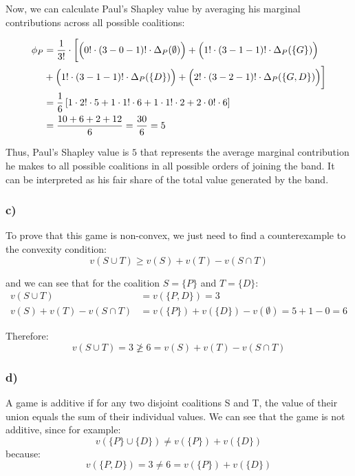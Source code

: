 \documentclass[10pt]{article}
\begin{document}
Now, we can calculate Paul's Shapley value by averaging his marginal contributions across all possible coalitions:

\begin{align*}
\phi_{P} &= \frac{1}{3!} \cdot
\biggl[
\Bigl(0! \cdot (3 - 0 - 1)! \cdot \Delta_{P}(\emptyset) \Bigr) +
\Bigl(1! \cdot (3 - 1 - 1)! \cdot \Delta_{P}(\{G\}) \Bigr) \\
&+ \Bigl(1! \cdot (3 - 1 - 1)! \cdot \Delta_{P}(\{D\}) \Bigr) +
\Bigl(2! \cdot (3 - 2 - 1)! \cdot \Delta_{P}(\{G,D\}) \Bigr)
\biggr] \\
&= \frac{1}{6}
\left[
1 \cdot 2! \cdot 5 +
1 \cdot 1! \cdot 6 +
1 \cdot 1! \cdot 2 +
2 \cdot 0! \cdot 6
\right] \\
&= \frac{10 + 6 + 2 + 12}{6}
= \frac{30}{6} = 5
\end{align*}

Thus, Paul's Shapley value is $5$ that represents the average marginal contribution he makes to all possible coalitions in all possible orders of joining the band. It can be interpreted as his fair share of the total value generated by the band.

\subsubsection*{c)}

To prove that this game is non-convex, we just need to find a counterexample to the convexity condition:
\[v(S \cup T) \geq v(S) + v(T) - v(S \cap T)\]

and we can see that for the coalition $S = \{P\}$ and $T = \{D\}$:
\begin{align*}
v(S \cup T) &= v(\{P,D\}) = 3 \\
v(S) + v(T) - v(S \cap T) &= v(\{P\}) + v(\{D\}) - v(\emptyset) = 5 + 1 - 0 = 6
\end{align*}

Therefore:
\[v(S \cup T) = 3 \not\geq 6 = v(S) + v(T) - v(S \cap T)\]

\subsubsection*{d)}

A game is additive if for any two disjoint coalitions S and T, the value of their union equals the sum of their individual values.
We can see that the game is not additive, since for example:
\[v(\{P\} \cup \{D\}) \neq v(\{P\}) + v(\{D\})\]
because:
\[v(\{P,D\}) = 3 \neq 6 = v(\{P\}) + v(\{D\})\]
\end{document}
